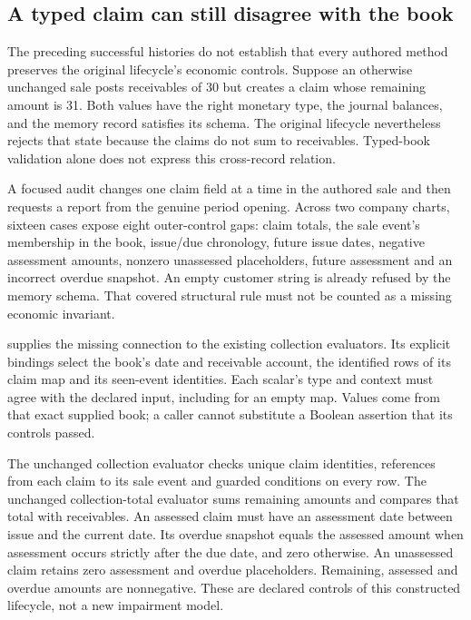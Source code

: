 \subsection{A typed claim can still disagree with the book}
\label{sec:authored-state-invariants}

The preceding successful histories do not establish that every authored method
preserves the original lifecycle's economic controls. Suppose an otherwise
unchanged sale posts receivables of 30 but creates a claim whose remaining
amount is 31. Both values have the right monetary type, the journal balances,
and the memory record satisfies its schema. The original lifecycle nevertheless
rejects that state because the claims do not sum to receivables. Typed-book
validation alone does not express this cross-record relation.

A focused audit changes one claim field at a time in the authored sale and
then requests a report from the genuine period opening. Across two company
charts, sixteen cases expose eight outer-control gaps: claim totals, the sale
event's membership in the book, issue/due chronology, future issue dates,
negative assessment amounts, nonzero unassessed placeholders, future assessment
and an incorrect overdue snapshot. An empty customer string is already refused
by the memory schema. That covered structural rule must not be counted as a
missing economic invariant.

 supplies the missing connection to the existing
collection evaluators. Its explicit bindings select the book's date and
receivable account, the identified rows of its claim map and its seen-event
identities. Each scalar's type and context must agree with the declared input,
including for an empty map. Values come from that exact supplied book; a caller
cannot substitute a Boolean assertion that its controls passed.

The unchanged collection evaluator checks unique claim identities, references
from each claim to its sale event and guarded conditions on every row. The
unchanged collection-total evaluator sums remaining amounts and compares that
total with receivables. An assessed claim must have an assessment date between
issue and the current date. Its overdue snapshot equals the assessed amount
when assessment occurs strictly after the due date, and zero otherwise.
An unassessed claim retains zero assessment and overdue placeholders. Remaining,
assessed and overdue amounts are nonnegative. These are declared controls of
this constructed lifecycle, not a new impairment model.

